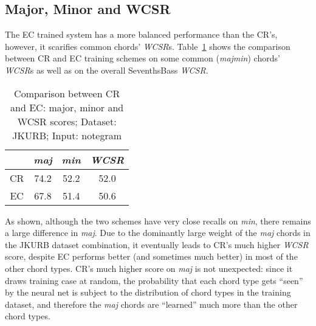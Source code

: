 \subsection{Major, Minor and WCSR}

The EC trained system has a more balanced performance than the CR's, however, it scarifies common chords' \textit{WCSR}s. Table~\ref{tab:sb} shows the comparison between CR and EC training schemes on some common (\textit{majmin}) \cite{burgoyne2011expert} chords' \textit{WCSR}s as well as on the overall SeventhsBass \textit{WCSR}.
\begin{table}[htb]
	\caption{Comparison between CR and EC: major, minor and WCSR scores; Dataset: JKURB; Input: notegram}
	\centering
	\footnotesize
	\begin{tabular}{|c|c|c|c|} \hline
		& \textit{maj} & \textit{min} & \textit{WCSR} \\ \hline
		CR & 74.2 & 52.2 & 52.0 \\ \hline
		EC &  67.8 & 51.4 & 50.6 \\ \hline
	\end{tabular}
	\label{tab:sb}
\end{table}

As shown, although the two schemes have very close recalls on \textit{min}, there remains a large difference in \textit{maj}. Due to the dominantly large weight of the \textit{maj} chords in the JKURB dataset combination, it eventually leads to CR's much higher \textit{WCSR} score, despite EC performs better (and sometimes much better) in most of the other chord types. CR's much higher score on \textit{maj} is not unexpected: since it draws training case at random, the probability that each chord type gets ``seen'' by the neural net is subject to the distribution of chord types in the training dataset, and therefore the \textit{maj} chords are ``learned'' much more than the other chord types.

